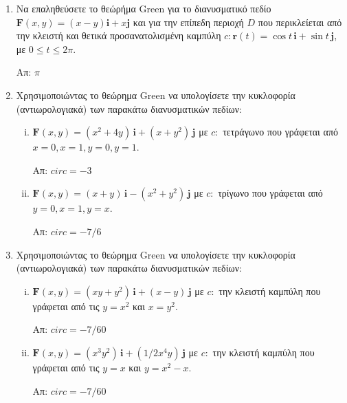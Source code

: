 \begin{enumerate}
  \item Να επαληθεύσετε το θεώρήμα Green για το διανυσματικό πεδίο 
    $ \mathbf{F}(x,y) = (x-y)\mathbf{i}+ x\mathbf{j} $ και για την επίπεδη περιοχή $D$ 
    που περικλείεται από την κλειστή και θετικά προσανατολισμένη καμπύλη 
    $ c \colon \mathbf{r}(t)= \cos{t}\, \mathbf{i} + \sin{t}\, \mathbf{j} $, με 
    $ 0 \leq t \leq 2 \pi $.

    \hfill Απ: $ \pi $ 

  \item Χρησιμοποιώντας το θεώρημα Green να υπολογίσετε την κυκλοφορία (αντιωρολογιακά) 
    των παρακάτω διανυσματικών πεδίων: 
    \begin{enumerate}[i)]
      \item $ \mathbf{F}(x,y) = (x^{2}+4y) \,\mathbf{i} + (x+y^{2}) \,\mathbf{j} $ 
        με $ c \colon $ τετράγωνο που γράφεται από $ x=0, x=1, y=0, y=1 $. 
        
        \hfill Απ: $ circ = -3 $  
      \item $ \mathbf{F}(x,y) = (x+y) \,\mathbf{i}- (x^{2}+y^{2}) \,\mathbf{j} $ 
        με $ c \colon $ τρίγωνο που γράφεται από $ y=0, x=1, y=x $.

        \hfill Απ: $ circ = -7/6 $  
    \end{enumerate}

  \item Χρησιμοποιώντας το θεώρημα Green να υπολογίσετε την κυκλοφορία (αντιωρολογιακά) 
    των παρακάτω διανυσματικών πεδίων: 
    \begin{enumerate}[i)]
      \item $ \mathbf{F}(x,y) = (xy+y^{2}) \,\mathbf{i} + (x-y) \,\mathbf{j} $ 
        με $ c \colon $ την κλειστή καμπύλη που γράφεται από τις $ y=x^{2} $ και 
        $ x = y^{2} $.  

        \hfill Απ: $ circ = -7/60 $  

      \item $ \mathbf{F}(x,y) = (x^{3}y^{2}) \,\mathbf{i} + (1/2x^{4}y) \,\mathbf{j} $ 
        με $ c \colon $ την κλειστή καμπύλη που γράφεται από τις $ y=x $ και 
        $ y = x^{2}-x $.  

        \hfill Απ: $ circ = -7/60 $  
    \end{enumerate}

    


\end{enumerate}
